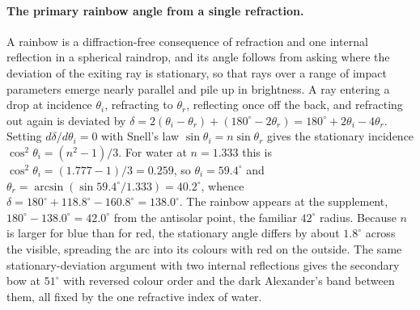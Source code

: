 \paragraph{The primary rainbow angle from a single refraction.} A rainbow is a
diffraction-free consequence of refraction and one internal reflection in a
spherical raindrop, and its angle follows from asking where the deviation of the
exiting ray is stationary, so that rays over a range of impact parameters emerge
nearly parallel and pile up in brightness. A ray entering a drop at incidence
$\theta_i$, refracting to $\theta_r$, reflecting once off the back, and
refracting out again is deviated by
$\delta = 2(\theta_i - \theta_r) + (180^{\circ} - 2\theta_r) =
180^{\circ} + 2\theta_i - 4\theta_r$. Setting $d\delta/d\theta_i = 0$ with
Snell's law $\sin\theta_i = n\sin\theta_r$ gives the stationary incidence
$\cos^2\theta_i = (n^2 - 1)/3$. For water at $n = 1.333$ this is
$\cos^2\theta_i = (1.777 - 1)/3 = 0.259$, so $\theta_i = 59.4^{\circ}$ and
$\theta_r = \arcsin(\sin 59.4^{\circ}/1.333) = 40.2^{\circ}$, whence
$\delta = 180^{\circ} + 118.8^{\circ} - 160.8^{\circ} = 138.0^{\circ}$. The
rainbow appears at the supplement, $180^{\circ} - 138.0^{\circ} = 42.0^{\circ}$
from the antisolar point, the familiar $42^{\circ}$ radius. Because $n$ is larger
for blue than for red, the stationary angle differs by about $1.8^{\circ}$
across the visible, spreading the arc into its colours with red on the outside.
The same stationary-deviation argument with two internal reflections gives the
secondary bow at $51^{\circ}$ with reversed colour order and the dark
Alexander's band between them, all fixed by the one refractive index of water.

